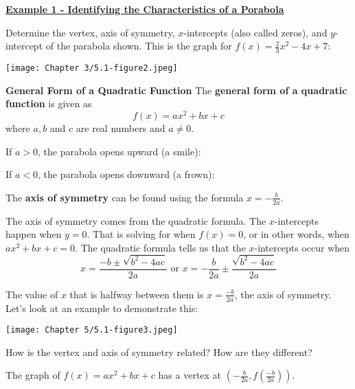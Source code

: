 \documentclass[12pt]{book}
\newcommand{\D}{\displaystyle}
\begin{document}
\newpage
  
\underline{\textbf{Example 1 - Identifying the Characteristics of a Porabola}}

   Determine the vertex, axis of symmetry, $x$-intercepts (also called zeros), and  $y$-intercept of the parabola shown. This is the graph for $f(x)=\frac{2}{3}x^2 -4x+7$:

   \centerline{\texttt{[image: Chapter 3/5.1-figure2.jpeg]}}

\vspace{80mm}
\begin{boxR}
    \textbf{General Form of a Quadratic Function}
     \vspace{1mm}
     \hline
     \vspace{2mm}
     The \textbf{general form of a quadratic function} is given as
     $$f(x)=ax^2+bx+c$$
     where $a,b$ and $c$ are real numbers and $a \neq 0$. 

      If $a>0$, the parabola opens upward (a smile):
      
      If $a<0$, the parabola opens downward (a frown):

The \textbf{axis of symmetry} can be found using the formula $x= -\frac{b}{2a}$.
 \end{boxR}

 \newpage

 
 

The axis of symmetry comes from the quadratic formula. The $x$-intercepts happen when $y=0$.  That is solving for when $f(x)=0$, or in other words, when $ax^2+bx+c=0$. The quadratic formula tells us that the $x$-intercepts occur when
$$x = \frac{-b \pm \sqrt{b^2-4ac}}{2a} \text{ or } x = -\frac{b}{2a} \pm \frac{\sqrt{b^2-4ac}}{2a} $$
 
 The value of $x$ that is halfway between them is $\D x=\frac{-b}{2a}$, the axis of symmetry. Let's look at an example to demonstrate this: 

{\hspace{-15mm}\texttt{[image: Chapter 5/5.1-figure3.jpeg]}}

\vspace{60mm}
How is the vertex and axis of symmetry related? How are they different?
\vspace{25mm}
\begin{boxR}
    The graph of $f(x)=ax^2+bx+c$ has a vertex at $(-\frac{b}{2a}, f(\frac{-b}{2a}))$.
\end{boxR}

\newpage
\end{document}
